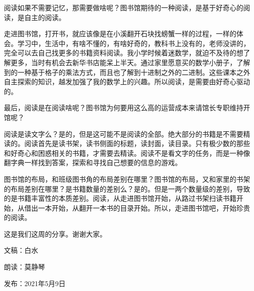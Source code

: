 阅读如果不需要记忆，那需要做啥呢？图书馆期待的一种阅读，是基于好奇心的阅读，是自主的阅读。



走进图书馆，打开书，就应该像是在小溪翻开石块找螃蟹一样的过程，一样的体会。学习中，生活中，有啥不懂的，有啥好奇的，教科书上没有的，老师没讲的，完全可以去自己找更多的书籍资料阅读。我小学时候着迷数学，就迫不及待的想了解更多，当时有机会去新华书店能呆上半天。通过家里愿意买的数学小册子，了解到的一种基于格子的乘法方式，而且也了解到十进制之外的二进制。这些课本之外自主探索的知识，越发加强了我的数学上的兴趣。所以阅读，是需要由好奇心驱动的。



最后，阅读是在阅读啥呢？图书馆为何要用这么高的运营成本来请馆长专职维持开馆呢？



阅读是读文字么？是的，但是这可能不是阅读的全部。绝大部分的书籍是不需要精读的。阅读首先是读书架，读书侧面的标题，读封面，读目录。只有极少数的那些和好奇心和困惑相关的书籍，才需要去精读。阅读不是看文字的任务，而是一种像翻字典一样找到答案，探索和寻找自己想要的信息的游戏。



图书馆的布局，和班级图书角的布局差别在哪里？图书馆的布局，又和家里的书架的布局差别在哪里？是书籍数量的差别么？是的。但是一两个数量级的差别，导致的是书籍丰富性的本质差别。阅读，从走进图书馆开始，从路过书架扫读书籍开始，从借出一本开始，从翻开一本书的目录开始。所以，走进图书馆吧，开始珍贵的阅读。



这是我们这周的分享。谢谢大家。

\vspace{10pt}



文稿：白水

朗读：莫静琴

发布：2021年5月9日








\vspace{10pt}

\hline

